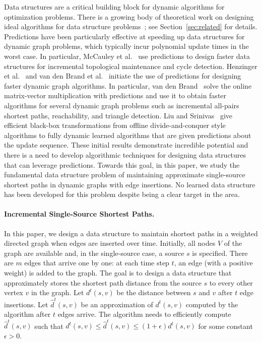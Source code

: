Data structures are a critical building block for dynamic algorithms for optimization problems.   
There is a growing body of theoretical work on designing ideal algorithms for data structure problems~\cite{LinLW22,
McCauleyMNS23,
McCauleyMoNi24,
BrandFNP24, liu2023predicted, 
benomar2024learningaugmented, 
zeynali2024robust, bai2023sorting,
dinitz2024binary}; see Section~\ref{sec:related} for details. 
Predictions have been particularly effective at speeding up 
data structures for dynamic graph problems, which typically incur polynomial update times in the worst case.  
In particular, McCauley et al.~\cite{McCauleyMoNi24} use
predictions to design faster data structures for incremental topological maintenance and cycle detection.  
Henzinger et al.~\cite{HenzingerSSY24} and van den Brand et al.~\cite{BrandFNP24} initiate the use of predictions for designing faster dynamic graph algorithms.
In particular, van den Brand~\cite{BrandFNP24} solve the online matrix-vector multiplication with predictions and use it to obtain faster algorithms for several dynamic graph problems such as incremental all-pairs shortest paths, reachability, and triangle detection. Liu and Srinivas~\cite{liu2023predicted} give efficient black-box transformations from  offline divide-and-conquer style algorithms to fully
dynamic learned algorithms that are given predictions about the update sequence.  
These initial results demonstrate incredible potential and there is a need to develop algorithmic techniques for designing data structures that can leverage predictions.  
Towards this goal, in this paper, we study the fundamental data structure problem of maintaining approximate single-source shortest paths in dynamic graphs with edge insertions. No learned data structure has been developed for this problem despite being a clear target in the area. 

\paragraph{Incremental Single-Source Shortest Paths.}  In this paper, we design a data structure to maintain shortest paths in a weighted directed graph when edges are inserted over time. 
Initially, all nodes $V$ of the graph are available and, in the single-source case, a source $s$ is specified. There are $m$ edges that arrive one by one:  at each time step $t$, an edge (with a positive weight) is added to the graph.   The goal is to design a data structure that approximately stores the shortest path distance from the source $s$ to every other vertex $v$ in the graph.   
Let $d^t(s,v)$ be the distance between $s$ and $v$ after $t$ edge insertions.  Let $\hat{d}^t(s,v)$ be an approximation of $d^t(s,v)$  computed by the algorithm after $t$ edges arrive. The algorithm needs to efficiently compute $\hat{d}^t(s,v)$ such that $d^t(s,v) \leq \hat{d}^t(s,v) \leq (1 + \epsilon) d^t(s,v)$ for some constant $\epsilon  > 0$.  

